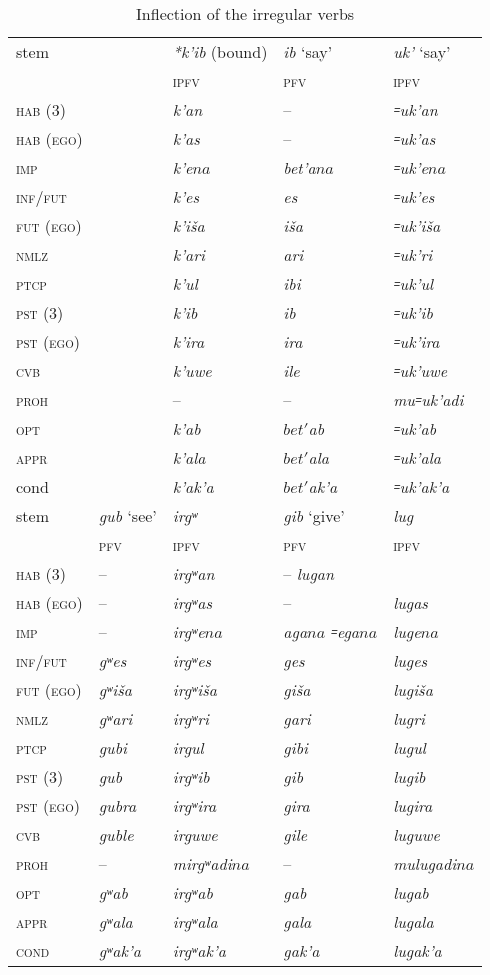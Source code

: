 \documentclass[output=paper]{langsci/langscibook}
\begin{document}
\begin{table}[p]
\caption{Inflection of the irregular verbs}\label{tab:4:18}

\begin{tabular}{@{}lllll@{}}
\toprule
stem & & \emph{*k'ib} (bound) & \emph{ib} `say' &
\emph{uk'} `say'\tabularnewline 
& & \textsc{ipfv} & \textsc{pfv} & \textsc{ipfv}\tabularnewline \midrule
\textsc{hab} (3) &  & \emph{k'an} & – & \emph{꞊uk'an}\tabularnewline
\textsc{hab (ego)} &  & \emph{k'as} & – & \emph{꞊uk'as}\tabularnewline
\textsc{imp} & & \emph{k'e\(na\)} & \emph{bet'a\(na\)} &
\emph{꞊uk'e\(na\)}\tabularnewline
\textsc{inf}/\textsc{fut} & & \emph{k'es} & \emph{es} &
\emph{꞊uk'es}\tabularnewline
\textsc{fut (ego)} & & \emph{k'iša} & \emph{iša} &
\emph{꞊uk'iša}\tabularnewline
\textsc{nmlz} & & \emph{k'ari} & \emph{ari} &
\emph{꞊uk'ri}\tabularnewline
\textsc{ptcp} & & \emph{k'ul} & \emph{ibi} &
\emph{꞊uk'ul}\tabularnewline
\textsc{pst} (3) &  & \emph{k'ib} & \emph{ib} & \emph{꞊uk'ib} \tabularnewline
\textsc{pst (ego)} &  & \emph{k'ira} &  \emph{ira} & \emph{꞊uk'ira}\tabularnewline
\textsc{cvb} & & \emph{k'uwe} & \emph{ile} &
\emph{꞊uk'uwe}\tabularnewline
\textsc{proh} & & – & – & \emph{mu꞊uk'adi}\tabularnewline
\textsc{opt} & & \emph{k'ab} & \emph{\(bet'\)ab} &
\emph{꞊uk'ab}\tabularnewline
\textsc{appr} & & \emph{k'ala} & \emph{\(bet'\)ala} &
\emph{꞊uk'ala}\tabularnewline
cond & & \emph{k'ak'a} & \emph{\(bet'\)ak'a} &
\emph{꞊uk'ak'a}\tabularnewline \midrule
stem & \emph{gub} `see' & \emph{irgʷ} & \emph{gib} `give' & \emph{lug}\tabularnewline
& \textsc{pfv} & \textsc{ipfv} & \textsc{pfv} & \textsc{ipfv} \tabularnewline \midrule
\textsc{hab} (3) & – & \emph{irgʷan} & – \emph{lugan} \tabularnewline
\textsc{hab (ego)} & – & \emph{irgʷas} & – & \emph{lugas}\tabularnewline
\textsc{imp} & – & \emph{irgʷe\(na\)} & \emph{aga\(na\)}
\emph{꞊ega\(na\)} & \emph{luge\(na\)}\tabularnewline
\textsc{inf}/\textsc{fut} & \emph{gʷes} & \emph{irgʷes} & \emph{ges} &
\emph{luges}\tabularnewline
\textsc{fut (ego)} & \emph{gʷiša} & \emph{irgʷiša} & \emph{giša} &
\emph{lugiša}\tabularnewline
\textsc{nmlz} & \emph{gʷari} & \emph{irgʷri} & \emph{gari} &
\emph{lugri}\tabularnewline
\textsc{ptcp} & \emph{gubi} & \emph{irgul} & \emph{gibi} &
\emph{lugul}\tabularnewline
\textsc{pst} (3) & \emph{gub} & \emph{irgʷib} & \emph{gib} & \emph{lugib} \tabularnewline
\textsc{pst (ego)} & \emph{gubra} &  \emph{irgʷira} &  \emph{gira} & \emph{lugira}\tabularnewline
\textsc{cvb} & \emph{guble} & \emph{irguwe} & \emph{gile} &
\emph{luguwe}\tabularnewline
\textsc{proh} & – & \emph{mirgʷadi\(na\)} & – &
\emph{mulugadi\(na\)}\tabularnewline
\textsc{opt} & \emph{gʷab} & \emph{irgʷab} & \emph{gab} &
\emph{lugab}\tabularnewline
\textsc{appr} & \emph{gʷala} & \emph{irgʷala} & \emph{gala} &
\emph{lugala}\tabularnewline
\textsc{cond} & \emph{gʷak'a} & \emph{irgʷak'a} & \emph{gak'a} &
\emph{lugak'a}\tabularnewline
\bottomrule
\end{tabular}
\end{table}
\end{document}
